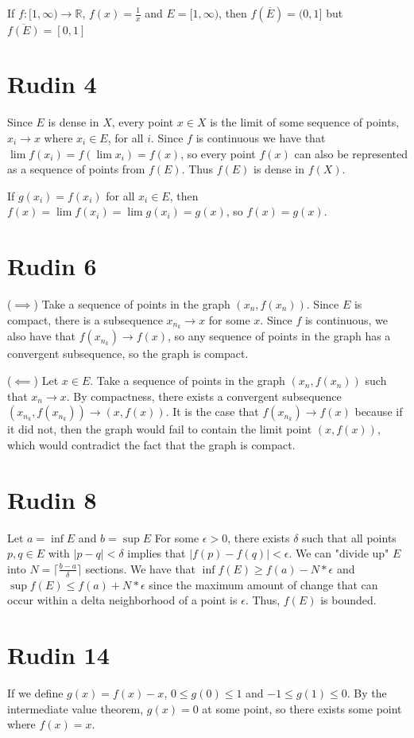 \documentclass{article}
\begin{document}
If $f: [1, \infty) \to \mathbb{R}$, $f(x) = \frac{1}{x}$
and $E = [1, \infty)$, then 
$f(\overline{E}) = (0,1]$ but $\overline{f(E)} = [0,1]$
\newpage

\section*{Rudin 4}
Since $E$ is dense in $X$, every point $x\in X$
is the limit of some sequence of points, $x_i \to x$ 
where $x_i \in E$, for all $i$.
Since $f$ is continuous we have that 
$\lim f(x_i) = f(\lim x_i) = f(x)$,
so every point $f(x)$ can also be represented as a 
sequence of points from $f(E)$.
Thus $f(E)$ is dense in $f(X)$.

If $g(x_i) = f(x_i)$ for all $x_i \in E$,
then $f(x) = \lim f(x_i) = \lim g(x_i) = g(x)$,
so $f(x) = g(x)$.
\newpage 

\section*{Rudin 6}
($\implies$)
Take a sequence of points in the graph $(x_n, f(x_n))$.
Since $E$ is compact, there is a subsequence $x_{n_k} \to x$
for some $x$.
Since $f$ is continuous, we also have that $f(x_{n_k}) \to f(x)$,
so any sequence of points in the graph has a convergent subsequence,
so the graph is compact.

($\impliedby$)
Let $x \in E$.
Take a sequence of points in the graph $(x_n, f(x_n))$ such that
$x_n \to x$.
By compactness, there exists a convergent subsequence 
$(x_{n_k}, f(x_{n_k})) \to (x, f(x))$.
It is the case that $f(x_{n_k}) \to f(x)$
because if it did not, then 
the graph would fail to contain the limit point $(x, f(x))$,
which would contradict the fact that the graph is compact.
\newpage 

\section*{Rudin 8}
Let $a = \inf E$ and $b = \sup E$
For some $\epsilon > 0$,
there exists $\delta$ such that all points 
$p,q \in E$ with $|p-q| < \delta$ implies that 
$|f(p) - f(q)| < \epsilon$.
We can "divide up" $E$ into $N = \lceil \frac{b-a}{\delta} \rceil$
sections.
We have that $\inf f(E) \geq f(a) - N*\epsilon$
and $\sup f(E) \leq f(a) + N*\epsilon$
since the maximum amount of change that can occur within
a delta neighborhood of a point is $\epsilon$.
Thus, $f(E)$ is bounded.
\newpage 

\section*{Rudin 14}
If we define $g(x) = f(x) - x$,
$0 \leq g(0) \leq 1$ and 
$-1 \leq g(1) \leq 0$. 
By the intermediate value theorem,
$g(x) = 0$ at some point,
so there exists some point where $f(x) = x$.
\newpage 
\end{document}
